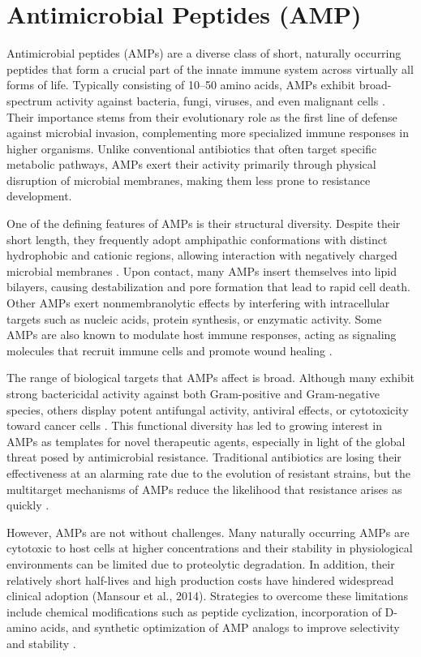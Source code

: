 \documentclass[a4paper,twoside,12pt]{book}
\begin{document}
\section{Antimicrobial Peptides (AMP)}

Antimicrobial peptides (AMPs) are a diverse class of short, naturally occurring peptides that form a crucial part of the innate immune system across virtually all forms of life. Typically consisting of 10–50 amino acids, AMPs exhibit broad-spectrum activity against bacteria, fungi, viruses, and even malignant cells \cite{bib:hancock2006}. Their importance stems from their evolutionary role as the first line of defense against microbial invasion, complementing more specialized immune responses in higher organisms. Unlike conventional antibiotics that often target specific metabolic pathways, AMPs exert their activity primarily through physical disruption of microbial membranes, making them less prone to resistance development\cite{bib:mahlapuu2016}.

One of the defining features of AMPs is their structural diversity. Despite their short length, they frequently adopt amphipathic conformations with distinct hydrophobic and cationic regions, allowing interaction with negatively charged microbial membranes \cite{bib:wang2016}. Upon contact, many AMPs insert themselves into lipid bilayers, causing destabilization and pore formation that lead to rapid cell death. Other AMPs exert nonmembranolytic effects by interfering with intracellular targets such as nucleic acids, protein synthesis, or enzymatic activity. Some AMPs are also known to modulate host immune responses, acting as signaling molecules that recruit immune cells and promote wound healing \cite{bib:mansour2014}.

The range of biological targets that AMPs affect is broad. Although many exhibit strong bactericidal activity against both Gram-positive and Gram-negative species, others display potent antifungal activity, antiviral effects, or cytotoxicity toward cancer cells \cite{bib:fjell2012}. This functional diversity has led to growing interest in AMPs as templates for novel therapeutic agents, especially in light of the global threat posed by antimicrobial resistance. Traditional antibiotics are losing their effectiveness at an alarming rate due to the evolution of resistant strains, but the multitarget mechanisms of AMPs reduce the likelihood that resistance arises as quickly \cite{bib:mahlapuu2016}.

However, AMPs are not without challenges. Many naturally occurring AMPs are cytotoxic to host cells at higher concentrations and their stability in physiological environments can be limited due to proteolytic degradation. In addition, their relatively short half-lives and high production costs have hindered widespread clinical adoption (Mansour et al., 2014). Strategies to overcome these limitations include chemical modifications such as peptide cyclization, incorporation of D-amino acids, and synthetic optimization of AMP analogs to improve selectivity and stability \cite{bib:fjell2012}.
\end{document}
